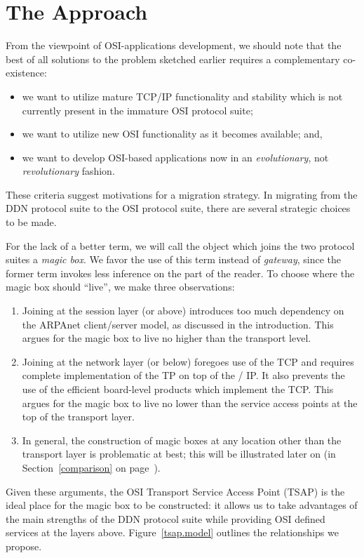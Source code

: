 
\section	{The Approach}
From the viewpoint of OSI-applications development,
we should note that the best of all solutions to the problem sketched earlier
requires a complementary co-existence:
\begin{itemize}
\item	we want to utilize mature TCP/IP functionality and stability which is
	not currently present in the immature OSI protocol suite;

\item	we want to utilize new OSI functionality as it becomes available;
	and,

\item	we want to develop OSI-based applications now in an {\em evolutionary},
	not {\em revolutionary} fashion.
\end{itemize}
These criteria suggest motivations for a migration strategy.
In migrating from the DDN protocol suite to the OSI protocol suite,
there are several strategic choices to be made.

For the lack of a better term,
we will call the object which joins the two protocol suites a {\em magic box}.
We favor the use of this term instead of {\em gateway},
since the former term invokes less inference on the part of the reader.
To choose where the magic box should ``live'',
we make three observations:
\begin{enumerate}
\item	Joining at the session layer (or above) introduces too much
dependency on the ARPAnet client/server model, as discussed in the
introduction.
This argues for the magic box to live no higher than the transport
level.

\item	Joining at the network layer (or below) foregoes use of the TCP and
requires complete implementation of the TP on top of the \dod/ IP.
It also prevents the use of the efficient board-level products which
implement the TCP.
This argues for the magic box to live no lower than the service
access points at the top of the transport layer.

\item	In general,
the construction of magic boxes at any location other than the transport
layer is problematic at best;
this will be illustrated later on
(in Section~\ref{comparison} on page~\pageref{comparison}).
\end{enumerate}
Given these arguments,
the OSI Transport Service Access Point (TSAP) is the ideal place for the magic
box to be constructed:
it allows us to take advantages of the main strengths of the DDN protocol
suite while providing OSI defined services at the layers above.
Figure~\ref{tsap.model} outlines the relationships we propose.


